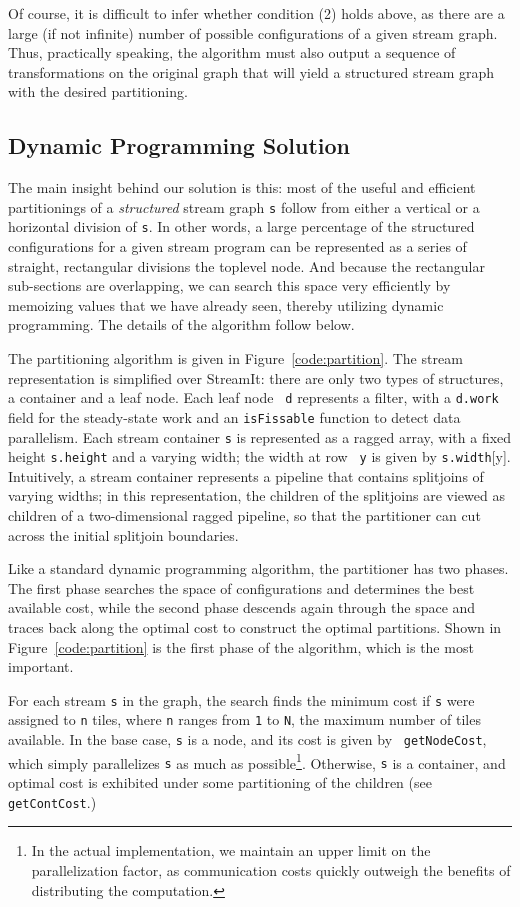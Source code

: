 Of course, it is difficult to infer whether condition (2) holds above,
as there are a large (if not infinite) number of possible
configurations of a given stream graph.  Thus, practically speaking,
the algorithm must also output a sequence of transformations on the
original graph that will yield a structured stream graph with the
desired partitioning.

\subsection{Dynamic Programming Solution}

The main insight behind our solution is this: most of the useful and
efficient partitionings of a {\it structured} stream graph {\tt s}
follow from either a vertical or a horizontal division of {\tt s}.  In
other words, a large percentage of the structured configurations for a
given stream program can be represented as a series of straight,
rectangular divisions the toplevel node.  And because the rectangular
sub-sections are overlapping, we can search this space very
efficiently by memoizing values that we have already seen, thereby
utilizing dynamic programming.  The details of the algorithm follow
below.

The partitioning algorithm is given in Figure~\ref{code:partition}.  The
stream representation is simplified over StreamIt: there are only two
types of structures, a container and a leaf node.  Each leaf node {\tt
d} represents a filter, with a {\tt d.work} field for the steady-state
work and an {\tt isFissable} function to detect data parallelism.
Each stream container {\tt s} is represented as a ragged array, with a
fixed height {\tt s.height} and a varying width; the width at row {\tt
y} is given by {\tt s.width}[y].  Intuitively, a stream container
represents a pipeline that contains splitjoins of varying widths; in
this representation, the children of the splitjoins are viewed as
children of a two-dimensional ragged pipeline, so that the partitioner
can cut across the initial splitjoin boundaries.

Like a standard dynamic programming algorithm, the partitioner has two
phases.  The first phase searches the space of configurations and
determines the best available cost, while the second phase descends
again through the space and traces back along the optimal cost to
construct the optimal partitions.  Shown in Figure~\ref{code:partition} is
the first phase of the algorithm, which is the most important.

For each stream {\tt s} in the graph, the search finds the minimum
cost if {\tt s} were assigned to {\tt n} tiles, where {\tt n} ranges
from {\tt 1} to {\tt N}, the maximum number of tiles available.  In
the base case, {\tt s} is a node, and its cost is given by {\tt
getNodeCost}, which simply parallelizes {\tt s} as much as
possible\footnote{In the actual implementation, we maintain an upper
limit on the parallelization factor, as communication costs quickly
outweigh the benefits of distributing the computation.}.  Otherwise,
{\tt s} is a container, and optimal cost is exhibited under some
partitioning of the children (see {\tt getContCost}.)

